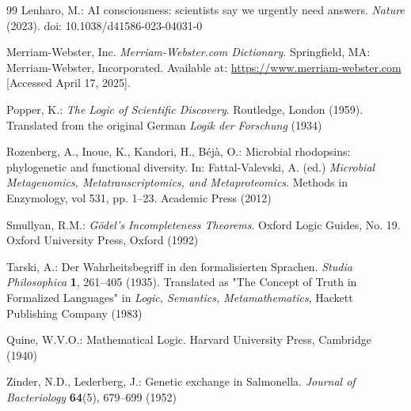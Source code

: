 \documentclass[runningheads]{llncs}
\begin{document}
\begin{thebibliography}{99}
Lenharo, M.: AI consciousness: scientists say we urgently need answers. \textit{Nature} (2023). doi: 10.1038/d41586-023-04031-0

Merriam-Webster, Inc. \emph{Merriam-Webster.com Dictionary}. Springfield, MA: Merriam-Webster, Incorporated. Available at: \url{https://www.merriam-webster.com} [Accessed April 17, 2025].



Popper, K.: \textit{The Logic of Scientific Discovery}. Routledge, London (1959). Translated from the original German \textit{Logik der Forschung} (1934)

Rozenberg, A., Inoue, K., Kandori, H., Béjà, O.: Microbial rhodopsins: phylogenetic and functional diversity. In: Fattal-Valevski, A. (ed.) \textit{Microbial Metagenomics, Metatranscriptomics, and Metaproteomics}. Methods in Enzymology, vol 531, pp. 1--23. Academic Press (2012)


Smullyan, R.M.: \textit{Gödel's Incompleteness Theorems}. Oxford Logic Guides, No. 19. Oxford University Press, Oxford (1992)

Tarski, A.: Der Wahrheitsbegriff in den formalisierten Sprachen. \textit{Studia Philosophica} \textbf{1}, 261--405 (1935). Translated as "The Concept of Truth in Formalized Languages" in \textit{Logic, Semantics, Metamathematics}, Hackett Publishing Company (1983)

Quine, W.V.O.: Mathematical Logic. Harvard University Press, Cambridge (1940)


Zinder, N.D., Lederberg, J.: Genetic exchange in Salmonella. \textit{Journal of Bacteriology} \textbf{64}(5), 679--699 (1952)
	
\end{thebibliography}
\end{document}
